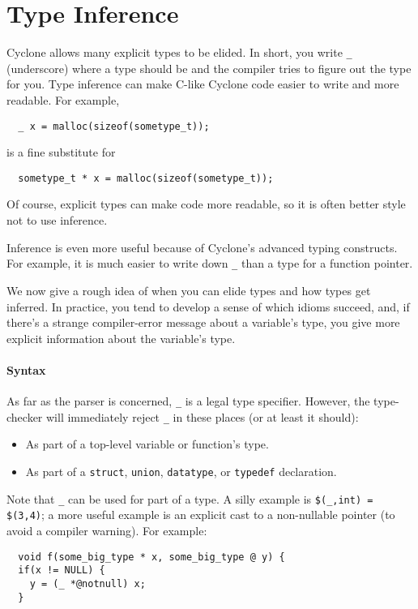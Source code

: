 \section{Type Inference}
\label{sec:typeinference}

Cyclone allows many explicit types to be elided.  In short, you write
\texttt{_} (underscore) where a type should be and the compiler tries to
figure out the type for you.  Type inference can make C-like Cyclone
code easier to write and more readable.  For example,
\begin{verbatim}
  _ x = malloc(sizeof(sometype_t));
\end{verbatim}
is a fine substitute for
\begin{verbatim}
  sometype_t * x = malloc(sizeof(sometype_t));
\end{verbatim}
Of course, explicit types can make code more readable, so it is often
better style not to use inference.

Inference is even more useful because of Cyclone's advanced typing
constructs.  For example, it is much easier to write down \texttt{_}
than a type for a function pointer.  

We now give a rough idea of when you can elide types and how types get
inferred.  In practice, you tend to develop a sense of which idioms
succeed, and, if there's a strange compiler-error message about a
variable's type, you give more explicit information about the
variable's type.

\paragraph{Syntax}
As far as the parser is
concerned, \texttt{_} is a legal type specifier.  However, the type-checker
will immediately reject \texttt{_} in these places (or at least it
should):

\begin{itemize}
\item As part of a top-level variable or function's type.
\item As part of a \texttt{struct}, \texttt{union}, 
 \texttt{datatype}, or
  \texttt{typedef} declaration.
\end{itemize}

Note that \texttt{_} can be used for part of a type.  A silly example is
\texttt{\$(_,int) = \$(3,4)}; a more useful example is an explicit cast to
a non-nullable pointer (to avoid a compiler warning).  For example:
\begin{verbatim}
  void f(some_big_type * x, some_big_type @ y) {
  if(x != NULL) {
    y = (_ *@notnull) x;
  }
\end{verbatim}

